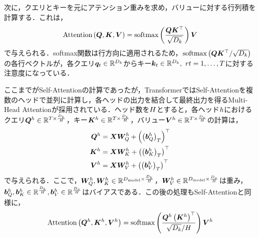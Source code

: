 \documentclass[12pt]{jarticle}
\numberwithin{equation}{section}    %
\numberwithin{figure}{section}      %
\numberwithin{table}{section}      %
\begin{document}
次に，クエリとキーを元にアテンション重みを求め，バリューに対する行列積を計算する．これは，
\begin{equation}
    \text{Attention}\left(\bm{Q}, \bm{K}, \bm{V}\right) = \text{softmax}\left(\frac{\bm{Q}\bm{K}^\top}{\sqrt{D_{k}}}\right) \bm{V}
\end{equation}
で与えられる．softmax関数は行方向に適用されるため，$\text{softmax}\left(\bm{Q}\bm{K}^\top / \sqrt{D_{k}}\right)$の各行ベクトルが，各クエリ$\bm{q}_{t} \in \mathbb{R}^{D_{k}}$からキー$\bm{k}_{t} \in \mathbb{R}^{D_{k}}, ~ r{t = 1, \ldots, T}$に対する注意度になっている．

ここまでがSelf-Attentionの計算であったが，TransformerではSelf-Attentionを複数のヘッドで並列に計算し，各ヘッドの出力を結合して最終出力を得るMulti-Head Attentionが採用されている．ヘッド数を$H$とすると，各ヘッド$h$におけるクエリ$\bm{Q}^{h} \in \mathbb{R}^{T \times \frac{D_{k}}{H}}$，キー$\bm{K}^{h} \in \mathbb{R}^{T \times \frac{D_{k}}{H}}$，バリュー$\bm{V}^{h} \in \mathbb{R}^{T \times \frac{D_{v}}{H}}$の計算は，
\begin{align}
    \bm{Q}^{h} & = \bm{X}\bm{W}_{Q}^{h} + \left(\left(\bm{b}_{Q}^{h}\right)_{T}\right)^\top \\
    \bm{K}^{h} & = \bm{X}\bm{W}_{K}^{h} + \left(\left(\bm{b}_{K}^{h}\right)_{T}\right)^\top \\
    \bm{V}^{h} & = \bm{X}\bm{W}_{V}^{h} + \left(\left(\bm{b}_{V}^{h}\right)_{T}\right)^\top
\end{align}
で与えられる．ここで，$\bm{W}_{Q}^{h}, \bm{W}_{K}^{h} \in \mathbb{R}^{D_{\text{model}} \times \frac{D_{k}}{H}}$，$\bm{W}_{V}^{h} \in \mathbb{R}^{D_{\text{model}} \times \frac{D_{v}}{H}}$は重み，$\bm{b}_{Q}^{h}, \bm{b}_{K}^{h} \in \mathbb{R}^{\frac{D_{k}}{H}}, \bm{b}_{V}^{h} \in \mathbb{R}^{\frac{D_{v}}{H}}$はバイアスである．この後の処理もSelf-Attentionと同様に，
\begin{equation}
    \text{Attention}\left(\bm{Q}^{h}, \bm{K}^{h}, \bm{V}^{h}\right) = \text{softmax}\left(\frac{\bm{Q}^{h}\left(\bm{K}^{h}\right)^\top}{\sqrt{D_{k}} / H}\right) \bm{V}^{h}
\end{equation}
\end{document}
